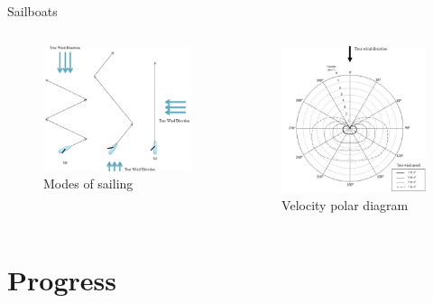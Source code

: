 \documentclass[10pt,xcolor={table,dvipsnames},t]{beamer}
\begin{document}
\begin{frame}{Sailboats}
\begin{columns}
\begin{figure}
    \centering
    \includegraphics[width=0.75\linewidth]{documents/figures/alves_modes.png}
    \caption{Modes of sailing \cite{Alves2010}}
    \label{fig:alves_modes}
\end{figure}
\begin{figure}
    \centering
    \includegraphics[width=0.7\linewidth]{documents/figures/alves_vpp.png}
    \caption{Velocity polar diagram \cite{Alves2010}}
    \label{fig:alves_velocity}
\end{figure}
\end{columns}
\end{frame}

\section{Progress}
\end{document}
